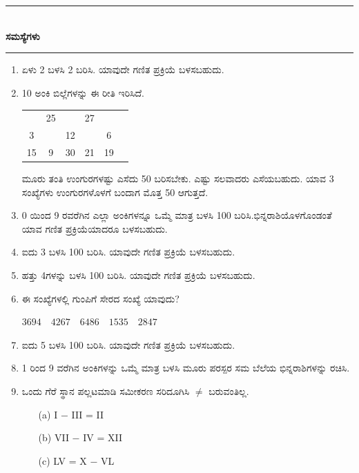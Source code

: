 \chapter[ಅಧ್ಯಾಯ 9]{}\label{chap9}

\begin{center}
\rule{5cm}{1pt}\\[5pt]
{\Large\bfseries ಸಮಸ್ಯೆಗಳು}\\[3pt]
\rule{5cm}{1pt}
\end{center}

\begin{enumerate}
\renewcommand{\labelenumi}{\bf\theenumi.}
\itemsep=5pt
\item ಏಳು 2 ಬಳಸಿ 2 ಬರಿಸಿ. ಯಾವುದೇ ಗಣಿತ ಪ್ರಕ್ರಿಯೆ ಬಳಸಬಹುದು. 

\item 10 ಅಂಕಿ ಬಿಲ್ಲೆಗಳನ್ನು ಈ ರೀತಿ ಇರಿಸಿದೆ. 

\begin{tabular}[t]{c@{\;}c@{\;}c@{\;}c@{\;}c@{\;}c}
& 25 & & 27 & & \\
3 & & 12 & & 6 & \\
15 & 9 & 30 & 21 & 19
\end{tabular}

ಮೂರು ತಂತಿ ಉಂಗುರಗಳಷ್ಟು ಎಸೆದು 50 ಬರಿಸಬೇಕು. ಎಷ್ಟು ಸಲವಾದರು ಎಸೆಯಬಹುದು. ಯಾವ 3 ಸಂಖ್ಯೆಗಳು ಉಂಗುರಗಳೊಳಗೆ ಬಂದಾಗ ಮೊತ್ತ 50 ಆಗುತ್ತದೆ. 

\item 0 ಯಿಂದ 9 ರವರೆಗಿನ ಎಲ್ಲಾ ಅಂಕಿಗಳನ್ನೂ ಒಮ್ಮೆ ಮಾತ್ರ ಬಳಸಿ 100 ಬರಿಸಿ.\break ಭಿನ್ನರಾಶಿಯೊಳಗೊಂಡಂತೆ ಯಾವ ಗಣಿತ ಪ್ರಕ್ರಿಯೆಯಾದರೂ ಬಳಸಬಹುದು. 

\item ಐದು 3 ಬಳಸಿ 100 ಬರಿಸಿ. ಯಾವುದೇ ಗಣಿತ ಪ್ರಕ್ರಿಯೆ ಬಳಸಬಹುದು. 

\item ಹತ್ತು 4ಗಳನ್ನು ಬಳಸಿ 100 ಬರಿಸಿ. ಯಾವುದೇ ಗಣಿತ ಪ್ರಕ್ರಿಯೆ ಬಳಸಬಹುದು. 

\item ಈ ಸಂಖ್ಯೆಗಳಲ್ಲಿ ಗುಂಪಿಗೆ ಸೇರದ ಸಂಖ್ಯೆ ಯಾವುದು? 

\medskip

$3694 \quad  4267 \quad   6486 \quad  1535 \quad  2847$

\item ಐದು 5 ಬಳಸಿ 100 ಬರಿಸಿ. ಯಾವುದೇ ಗಣಿತ ಪ್ರಕ್ರಿಯೆ ಬಳಸಬಹುದು. 

\eject 

\item 1 ರಿಂದ 9 ವರೆಗಿನ ಅಂಕಿಗಳನ್ನು ಒಮ್ಮೆ ಮಾತ್ರ ಬಳಸಿ ಮೂರು ಪರಸ್ಪರ ಸಮ ಬೆಲೆಯ ಭಿನ್ನರಾಶಿಗಳನ್ನು ರಚಿಸಿ. 

\item ಒಂದು ಗೆರೆ ಸ್ಥಾನ ಪಲ್ಲಟಮಾಡಿ ಸಮೀಕರಣ ಸರಿದೂಗಿಸಿ $\neq$ ಬರುವಂತಿಲ್ಲ. 
\begin{itemize}
\item[(a)] I $-$ III = II
\item[(b)] VII $-$ IV = XII
\item[(c)] LV = X $-$ VL
\end{itemize}


\end{enumerate}
